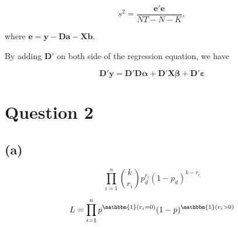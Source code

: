 \documentclass[
]{article}
\begin{document}
\[s^2 = \frac{\boldsymbol{e}'\boldsymbol{e}}{NT-N-K},\]

where
\(\boldsymbol{e} = \boldsymbol{y}-\boldsymbol{Da}-\boldsymbol{Xb}\).

By adding \(\boldsymbol{D}'\) on both side of the regression equation,
we have

\[\boldsymbol{D'y} = \boldsymbol{D'D\alpha} + \boldsymbol{D'X\beta} + \boldsymbol{D'\varepsilon}\]

\hypertarget{question-2}{%
\section{Question 2}\label{question-2}}

\hypertarget{a-1}{%
\subsection{(a)}\label{a-1}}

\[\prod_{i=1}^{n}{k \choose r_i}p_d^{r_i}(1-p_d)^{k-r_i}\]

\[L = \prod_{i=1}^{n}p^{\mathbbm{1}(r_i=0)}(1-p)^{\mathbbm{1}(r_i>0)}\]
\end{document}
